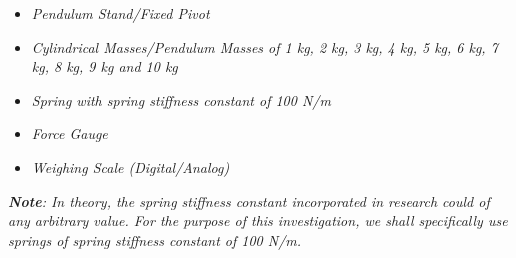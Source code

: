 \begin{itemize}
    \item \textit{Pendulum Stand/Fixed Pivot}
    \item \textit{Cylindrical Masses/Pendulum Masses of 1 kg, 2 kg, 3 kg, 4 kg, 5 kg, 6 kg, 7 kg, 8 kg, 9 kg and 10 kg}
    \item \textit{Spring with spring stiffness constant of 100 N/m}
    \item \textit{Force Gauge}
    \item \textit{Weighing Scale (Digital/Analog)}
    \label{mat}
\end{itemize}

\textit{\textbf{Note}: In theory, the spring stiffness constant incorporated in research could of any arbitrary value. For the purpose of this investigation, we shall specifically use springs of spring stiffness constant of 100 N/m.}


